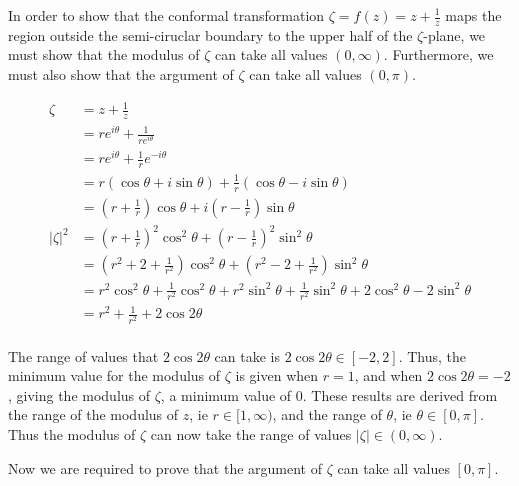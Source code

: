 \documentclass[a4paper]{article}
\begin{document}
\begin{enumerate}[label=\textbf{\arabic*.}]
\begin{enumerate}
\begin{enumerate}
			\pagebreak

			In order to show that the conformal transformation $\displaystyle{\zeta = f(z) = z + \frac{1}{z}}$ maps the region outside the semi-ciruclar boundary to the upper half of the $\displaystyle{\zeta}$-plane, we must show that the modulus of $\displaystyle{\zeta}$ can take all values $\displaystyle{(0,\infty)}$. Furthermore, we must also show that the argument of $\displaystyle{\zeta}$ can take all values $\displaystyle{(0,\pi)}$.

			\begin{align*}
			\zeta & = z + \frac{1}{z}\\
			& = re^{i\theta} + \frac{1}{re^{i\theta}}\\
			& = re^{i\theta} + \frac{1}{r}e^{-i\theta}\\
			& = r\left(\cos\theta + i\sin\theta\right) + \frac{1}{r}\left(\cos\theta - i\sin\theta\right)\\
			& = \left(r+\frac{1}{r}\right)\cos\theta + i\left(r-\frac{1}{r}\right)\sin\theta\\
			\left|\zeta\right|^2 & =  \left(r+\frac{1}{r}\right)^2\cos^2\theta + \left(r-\frac{1}{r}\right)^2\sin^2\theta\\
			& = \left(r^2+2+\frac{1}{r^2}\right)\cos^2\theta + \left(r^2 - 2 + \frac{1}{r^2}\right)\sin^2\theta\\
			& = r^2\cos^2\theta + \frac{1}{r^2}\cos^2\theta + r^2\sin^2\theta + \frac{1}{r^2}\sin^2\theta + 2\cos^2\theta -2\sin^2\theta\\
			& = r^2 + \frac{1}{r^2} + 2\cos2\theta\\
			\end{align*}

			The range of values that $\displaystyle{2\cos2\theta}$ can take is $\displaystyle{2\cos2\theta \in [-2,2]}$. Thus, the minimum value for the modulus of $\displaystyle{\zeta}$ is given when $\displaystyle{r=1}$, and when $\displaystyle{2\cos2\theta = -2}$, giving the modulus of $\displaystyle{\zeta}$, a minimum value of $\displaystyle{0}$. These results are derived from the range of the modulus of $\displaystyle{z}$, ie $\displaystyle{r \in [1,\infty)}$, and the range of $\displaystyle{\theta}$, ie $\displaystyle{\theta \in [0,\pi]}$. Thus the modulus of $\displaystyle{\zeta}$ can now take the range of values $\displaystyle{|\zeta| \in (0,\infty)}$.

			\bigbreak

			Now we are required to prove that the argument of $\displaystyle{\zeta}$ can take all values $\displaystyle{[0,\pi]}$. 


\end{enumerate}
\end{enumerate}
\end{enumerate}
\end{document}
